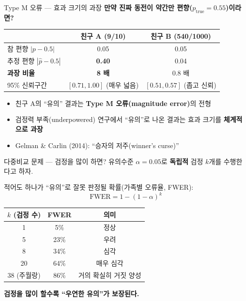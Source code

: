 \documentclass[aspectratio=169, 11pt]{beamer}
\begin{document}
\begin{frame}{Type M 오류 — 효과 크기의 과장}
\textbf{만약 진짜 동전이 약간만 편향($p_{\text{true}} = 0.55$)이라면?}
\vspace{0.3cm}

\begin{tabular}{lcc}
\toprule
 & 친구 A (9/10) & 친구 B (540/1000) \\
\midrule
참 편향 $|p-0.5|$ & 0.05 & 0.05 \\
추정 편향 $|\hat p-0.5|$ & \textbf{0.40} & 0.04 \\
\textbf{과장 비율} & \textbf{8 배} & 0.8 배 \\
95\% 신뢰구간 & $[0.71, 1.00]$ (매우 넓음) & $[0.51, 0.57]$ (좁고 신뢰) \\
\bottomrule
\end{tabular}

\vspace{0.4cm}
\begin{itemize}
\item 친구 A의 ``유의'' 결과는 \textbf{Type M 오류(magnitude error)}의 전형
\item 검정력 부족(underpowered) 연구에서 ``유의''로 나온 결과는 효과 크기를 \textbf{체계적으로 과장}
\item Gelman \& Carlin (2014): ``승자의 저주(winner's curse)''
\end{itemize}
\end{frame}

\begin{frame}{다중비교 문제 — 검정을 많이 하면?}
유의수준 $\alpha = 0.05$로 \textbf{독립적} 검정 $k$개를 수행한다고 하자.

\vspace{0.3cm}
적어도 하나가 ``유의''로 잘못 판정될 확률(가족별 오류율, FWER):
$$
\text{FWER} = 1 - (1 - \alpha)^k
$$

\vspace{0.3cm}
\begin{tabular}{ccc}
\toprule
$k$ (검정 수) & FWER & 의미 \\
\midrule
1 & 5\% & 정상 \\
5 & 23\% & 우려 \\
8 & 34\% & 심각 \\
20 & 64\% & 매우 심각 \\
38 (주월랑) & 86\% & 거의 확실히 거짓 양성 \\
\bottomrule
\end{tabular}

\vspace{0.3cm}
\centering
\textbf{검정을 많이 할수록 ``우연한 유의''가 보장된다.}
\end{frame}
\end{document}
